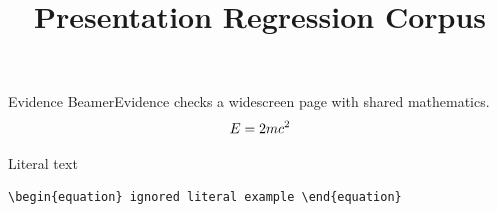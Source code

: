 \documentclass[aspectratio=169]{beamer}
\title{Presentation Regression Corpus}
\begin{document}
\begin{frame}{Evidence}
BeamerEvidence checks a widescreen page with shared mathematics.
\begin{equation}\label{eq:slide}
E=2 m c^2
\end{equation}
\end{frame}
\begin{frame}[fragile]{Literal text}
\begin{verbatim}
\begin{equation} ignored literal example \end{equation}
\end{verbatim}
\end{frame}
\end{document}
